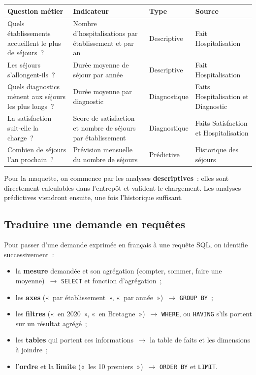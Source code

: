 \begin{center}
\small
\begin{tabularx}{\textwidth}{>{\raggedright\arraybackslash}X >{\raggedright\arraybackslash}X l l}
\toprule
\textbf{Question métier} & \textbf{Indicateur} & \textbf{Type} & \textbf{Source} \\
\midrule
Quels établissements accueillent le plus de séjours~? & Nombre d'hospitalisations par établissement et par an & Descriptive & Fait Hospitalisation \\
Les séjours s'allongent-ils~? & Durée moyenne de séjour par année & Descriptive & Fait Hospitalisation \\
Quels diagnostics mènent aux séjours les plus longs~? & Durée moyenne par diagnostic & Diagnostique & Faits Hospitalisation et Diagnostic \\
La satisfaction suit-elle la charge~? & Score de satisfaction et nombre de séjours par établissement & Diagnostique & Faits Satisfaction et Hospitalisation \\
Combien de séjours l'an prochain~? & Prévision mensuelle du nombre de séjours & Prédictive & Historique des séjours \\
\bottomrule
\end{tabularx}
\end{center}

\noindent Pour la maquette, on commence par les analyses \textbf{descriptives}~: elles sont directement calculables dans l'entrepôt et valident le chargement. Les analyses prédictives viendront ensuite, une fois l'historique suffisant.

\subsection{Traduire une demande en requêtes}

\noindent Pour passer d'une demande exprimée en français à une requête SQL, on identifie successivement~:
\begin{itemize}
	\item la \textbf{mesure} demandée et son agrégation (compter, sommer, faire une moyenne)~$\rightarrow$ \texttt{SELECT} et fonction d'agrégation~;
	\item les \textbf{axes} («~par établissement~», «~par année~»)~$\rightarrow$ \texttt{GROUP BY}~;
	\item les \textbf{filtres} («~en 2020~», «~en Bretagne~»)~$\rightarrow$ \texttt{WHERE}, ou \texttt{HAVING} s'ils portent sur un résultat agrégé~;
	\item les \textbf{tables} qui portent ces informations~$\rightarrow$ la table de faits et les dimensions à joindre~;
	\item l'\textbf{ordre} et la \textbf{limite} («~les 10 premiers~»)~$\rightarrow$ \texttt{ORDER BY} et \texttt{LIMIT}.
\end{itemize}

